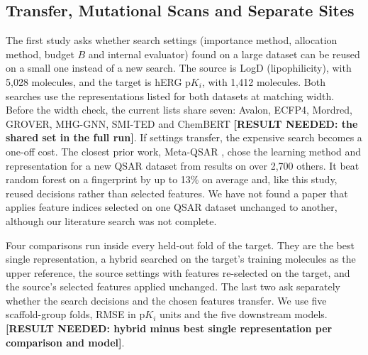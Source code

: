 \subsection{Transfer, Mutational Scans and Separate Sites}\label{sec:method:sites}


The first study asks whether search settings (importance method, allocation method, budget $B$ and internal evaluator) found on a large dataset can be reused on a small one instead of a new search. The source is LogD (lipophilicity), with 5,028 molecules, and the target is hERG $\mathrm{p}K_i$, with 1,412 molecules. Both searches use the representations listed for both datasets at matching width. Before the width check, the current lists share seven: Avalon, ECFP4, Mordred, GROVER, MHG-GNN, SMI-TED and ChemBERT \textbf{[RESULT NEEDED: the shared set in the full run]}. If settings transfer, the expensive search becomes a one-off cost. The closest prior work, Meta-QSAR \citep{Olier2018}, chose the learning method and representation for a new QSAR dataset from results on over 2,700 others. It beat random forest on a fingerprint by up to 13\% on average and, like this study, reused decisions rather than selected features. We have not found a paper that applies feature indices selected on one QSAR dataset unchanged to another, although our literature search was not complete.

Four comparisons run inside every held-out fold of the target. They are the best single representation, a hybrid searched on the target's training molecules as the upper reference, the source settings with features re-selected on the target, and the source's selected features applied unchanged. The last two ask separately whether the search decisions and the chosen features transfer. We use five scaffold-group folds, RMSE in $\mathrm{p}K_i$ units and the five downstream models. \textbf{[RESULT NEEDED: hybrid minus best single representation per comparison and model]}.

